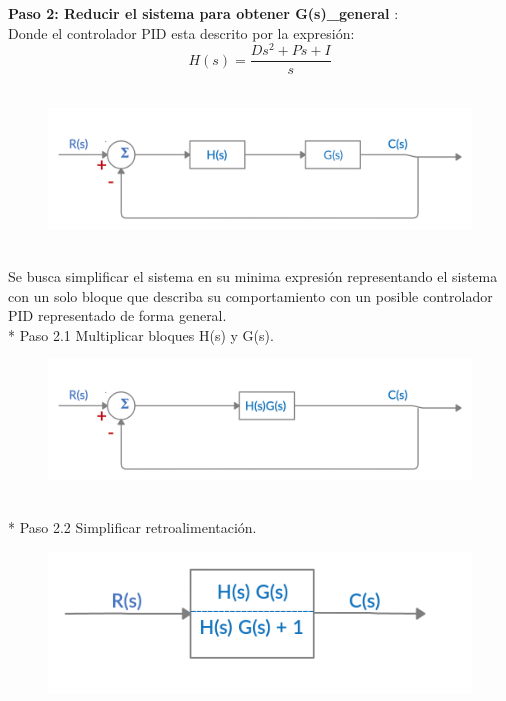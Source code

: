 \documentclass[12pt,letterpaper]{article}
\begin{document}
\setcounter{equation}{0} %
\textbf{Paso 2: Reducir el sistema para obtener G(s)_{general} }: \\

Donde el controlador PID esta descrito por la expresión:  \\ 

\begin{equation}H(s)=\frac{Ds^{2}+Ps+I}{s}\end{equation} \\

\begin{figure}[h]
  \includegraphics[scale= 0.19]{tfpid.png}
  \label{fig:Bloques}
\end{figure} \\  


Se busca simplificar el sistema en su minima expresión  representando el sistema con un solo bloque que describa su comportamiento con un posible controlador PID representado de forma general. \\ 

* Paso 2.1 Multiplicar bloques H(s) y G(s). \\

\begin{figure}[h]
  \includegraphics[scale= 0.19]{tfpid1.png}
  \label{fig:Bloques}
\end{figure} \\  


* Paso 2.2 Simplificar retroalimentación.

\begin{figure}[h]
  \includegraphics[scale= 0.19]{tfpid2.png}
  \label{fig:Bloques}
\end{figure} \\  
\end{document}
